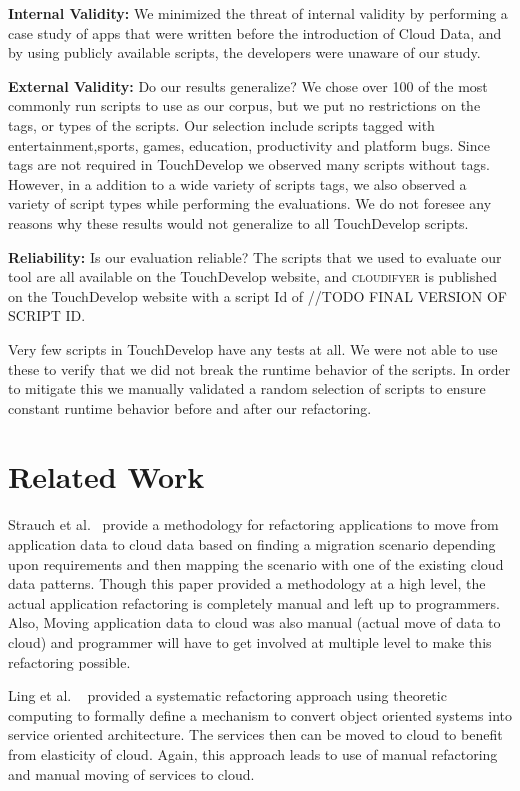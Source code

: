 \documentclass{sigplanconf}
\begin{document}
\textbf{Internal Validity:}  We minimized the threat of internal validity by performing a case study of apps that were written before the introduction of Cloud Data, and by using publicly available scripts, the developers were unaware of our study.  

\textbf{External Validity:}  Do our results generalize? We chose over 100 of the most commonly run scripts to use as our corpus, but we put no restrictions on the tags, or types of the scripts.  Our selection include scripts tagged with entertainment,sports, games, education, productivity and platform bugs.  Since tags are not required in TouchDevelop we observed many scripts without tags.  However, in a addition to a wide variety of scripts tags, we also observed a variety of script types while performing the evaluations.  We do not foresee any reasons why these results would not generalize to all TouchDevelop scripts.

\textbf{Reliability:} Is our evaluation reliable? The scripts that we used to evaluate our tool are all available on the TouchDevelop website, and \textsc{cloudifyer} is published on the TouchDevelop website with a script Id of //TODO FINAL VERSION OF SCRIPT ID.

Very few scripts in TouchDevelop have any tests at all.  We were not able to use these to verify that we did not break the runtime behavior of the scripts.  In order to mitigate this we manually validated a random selection of scripts to ensure constant runtime behavior before and after our refactoring.



\section{Related Work}
\label{sec:relatedWork}

Strauch et al.~\cite{strauchmigrating} provide a methodology for refactoring applications to move from application data to cloud data based on finding a migration scenario depending upon requirements and then mapping the scenario with one of the existing cloud data patterns. Though this paper provided a methodology at a high level, the actual application refactoring is completely manual and left up to programmers. Also, Moving application data to cloud was also manual (actual move of data to cloud) and programmer will have to get involved at multiple level to make this refactoring possible.  

Ling et al. ~\cite{ling2010refactoring} provided a systematic refactoring approach using theoretic computing to formally define a mechanism to convert object oriented systems into service oriented architecture. The services then can be moved to cloud to benefit from elasticity of cloud. Again, this approach leads to use of manual refactoring and manual moving of services to cloud. 
\end{document}
